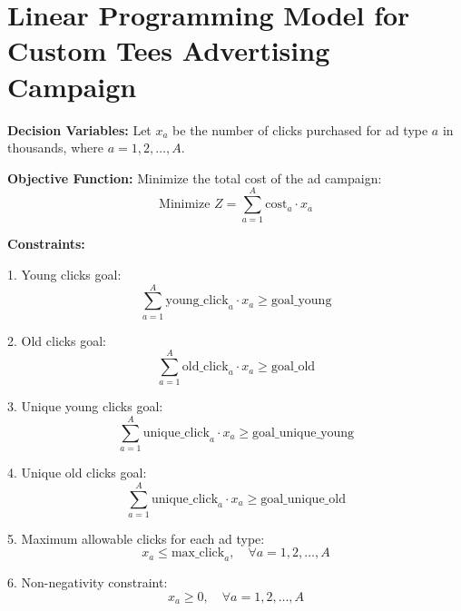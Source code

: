 \documentclass{article}
\begin{document}
\section*{Linear Programming Model for Custom Tees Advertising Campaign}

\textbf{Decision Variables:}
Let \( x_a \) be the number of clicks purchased for ad type \( a \) in thousands, where \( a = 1, 2, \ldots, A \).

\textbf{Objective Function:}
Minimize the total cost of the ad campaign:
\[
\text{Minimize } Z = \sum_{a=1}^{A} \text{cost}_a \cdot x_a
\]

\textbf{Constraints:}

1. Young clicks goal:
\[
\sum_{a=1}^{A} \text{young\_click}_{a} \cdot x_a \geq \text{goal\_young}
\]

2. Old clicks goal:
\[
\sum_{a=1}^{A} \text{old\_click}_{a} \cdot x_a \geq \text{goal\_old}
\]

3. Unique young clicks goal:
\[
\sum_{a=1}^{A} \text{unique\_click}_{a} \cdot x_a \geq \text{goal\_unique\_young}
\]

4. Unique old clicks goal:
\[
\sum_{a=1}^{A} \text{unique\_click}_{a} \cdot x_a \geq \text{goal\_unique\_old}
\]

5. Maximum allowable clicks for each ad type:
\[
x_a \leq \text{max\_click}_{a}, \quad \forall a = 1, 2, \ldots, A
\]

6. Non-negativity constraint:
\[
x_a \geq 0, \quad \forall a = 1, 2, \ldots, A
\]
\end{document}
